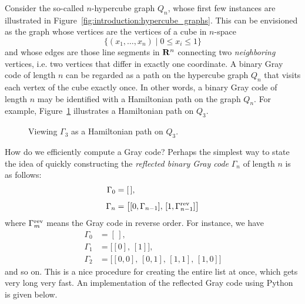 Consider the so-called $n$-hypercube graph
$Q_n$, whose first few instances are illustrated in
Figure~\ref{fig:introduction:hypercube_graphs}. This can be envisioned
as the graph whose vertices are the vertices of a cube in
$n$-space
\[
\{(x_1, \dots, x_n) \mid 0 \leq x_i \leq 1\}
\]
and whose edges are those line segments in $\mathbf{R}^n$ connecting two
\emph{neighboring} vertices, i.e. two vertices that differ in exactly
one coordinate. A binary Gray code of length
$n$ can be regarded as a
path on the hypercube graph $Q_n$ that visits
each vertex of the cube exactly once. In other words, a binary Gray
code of length $n$ may be identified with a
Hamiltonian path on the graph $Q_n$. For
example, Figure~\ref{fig:trees_forests:gray_code_cube} illustrates a
Hamiltonian path on $Q_3$.

\begin{figure}[!htbp]
\centering
{}

\caption{Viewing $\Gamma_3$ as a Hamiltonian path on $Q_3$.}
\label{fig:trees_forests:gray_code_cube}
\end{figure}

How do we efficiently compute a Gray code? Perhaps
the simplest way to state the idea of quickly constructing the
\emph{reflected binary Gray code}
$\Gamma_n$ of length $n$ is as follows:
\begin{align*}
\Gamma_0 &= [\,], \\[4pt]
\Gamma_{n} &= \big[[0, \Gamma_{n-1}],\, [1, \Gamma_{n-1}^{\rm rev}]\big]
\end{align*}
where $\Gamma_m^{\rm rev}$ means the Gray code in reverse order. For
instance, we have
\begin{align*}
\Gamma_0 &= [\,], \\[4pt]
\Gamma_1 &= \big[[0],\, [1]\big], \\[4pt]
\Gamma_2 &= \big[[0,0],\, [0,1],\, [1,1],\, [1,0]\big]
\end{align*}
and so on. This is a nice procedure for creating the entire list at
once, which gets very long very fast. An implementation of the
reflected Gray code using Python is given below.

